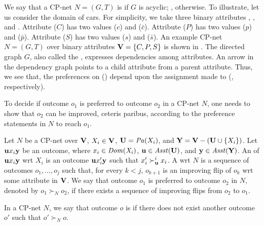 We say that a CP-net $N=(G,T)$ is  if
$G$ is acyclic; , otherwise.
To illustrate, let us consider the domain of cars.
For simplicity, we take three binary attributes
, , and .
Attribute  ($C$) has two values  ($c$) 
and  ($\bar{c}$).
Attribute  ($P$) has two values  ($p$) 
and  ($\bar{p}$).
Attribute  ($S$) has two values  ($s$) 
and  ($\bar{s}$).
An example CP-net $N=(G,T)$ over binary attributes $\textbf{V}=\{C,P,S\}$
is shown in .
The directed graph $G$, also called the , expresses
dependencies among attributes.  An arrow in the dependency graph points
to a child attribute from a parent attribute. Thus, we see that,
the preferences on  () depend upon the assignment made
to  (, respectively).

To decide if outcome $o_1$ is preferred to outcome $o_2$ in a CP-net $N$,
one needs to show that $o_2$ can be improved, ceteris paribus, 
according to the preference statements in $N$ to reach $o_1$.

\begin{definition}
	Let $N$ be a CP-net over $\textbf{V}$, $X_i \in \textbf{V}$, $\textbf{U} = \mathit{Pa}(X_i)$,
	and $\textbf{Y}=\textbf{V}-(\textbf{U} \cup \{X_i\})$.
	Let $\textbf{u} x_i \textbf{y}$ be an outcome, where $x_i\in \it{Dom}(X_i)$,
	$\textbf{u} \in \mathit{Asst}(\textbf{U})$, and $\textbf{y} \in \mathit{Asst}(\textbf{Y})$.
	An  of $\textbf{u} x_i \textbf{y}$ wrt $X_i$ is an
	outcome $\textbf{u} x_i' \textbf{y}$ such that $x_i' \succ^i_{\textbf{u}} x_i$.
	A  wrt $N$ is a sequence of
	outcomes $o_1,\ldots,o_j$ such that, for every $k<j$,
	$o_{k+1}$ is an improving flip of $o_k$ wrt some attribute in $\textbf{V}$.
	We say that outcome $o_1$ is preferred to outcome $o_2$ in $N$,
	denoted by $o_1 \succ_N o_2$, if there exists a sequence of
	improving flips from $o_2$ to $o_1$.
\end{definition}

In a CP-net $N$, we say that outcome $o$ is  if
there does not exist another outcome $o'$ such that
$o' \succ_N o$.


